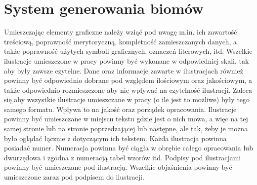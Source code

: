 \section{System generowania biomów}

Umieszczając elementy graficzne należy wziąć pod uwagę m.in. ich zawartość treściową, poprawność merytoryczną, kompletność zamieszczanych danych, a także poprawność użytych symboli graficznych, oznaczeń literowych, itd. Wszelkie ilustracje umieszczone w pracy powinny być wykonane w odpowiedniej skali, tak aby były zawsze czytelne. Dane oraz informacje zawarte w ilustracjach również powinny być odpowiednio dobrane pod względem ilościowym oraz jakościowym, a także odpowiednio rozmieszczone aby nie wpływać na czytelność ilustracji. Zaleca się aby wszystkie ilustracje umieszczane w pracy (o ile jest to możliwe) były tego samego formatu. Wpływa to na jakość oraz porządek opracowania. Ilustracje powinny być umieszczane w miejscu tekstu gdzie jest o nich mowa, a więc na tej samej stronie lub na stronie poprzedzającej lub następne, ale tak, żeby je można było oglądać łącznie z dotyczącym ich tekstem. Każda ilustracja powinna posiadać numer. Numeracja powinna być ciągła w obrębie  całego opracowania lub dwurzędowa i zgodna z numeracją tabel wzorów itd. Podpisy pod 
ilustracjami powinny być umieszczane pod ilustracją. Wszelkie objaśnienia powinny być umieszczone 
zaraz pod podpisem do ilustracji.
